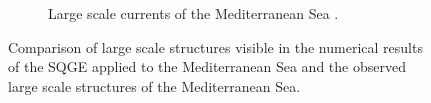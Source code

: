 \begin{figure}
\begin{subfigure}[b]{\textwidth}
\begin{center}
      \caption{Large scale currents of the Mediterranean Sea \cite{Ayoub1998}.}
    \label{fig:GyresMed}
    \end{center}
  \end{subfigure}
  \caption{Comparison of large scale structures visible in the numerical results
    of the SQGE applied to the Mediterranean Sea and the observed large scale
    structures of the Mediterranean Sea.}
  \label{fig:MedCompare}
\end{figure}

